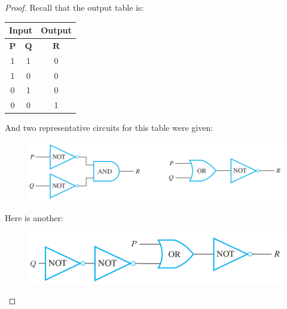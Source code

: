 \documentclass[14pt]{extarticle}
\newcommand{\cy}{\color{cyan}}
\begin{document}
\begin{proof}
        Recall that the output table is:

        \begin{center}
                \begin{tabular}{|cc|c|}
                        \hline
                        \multicolumn{2}{|c|}{\cy Input} & {\cy Output}              \\
                        \hline
                        \(\bm{P}\)                      & \(\bm{Q}\)   & \(\bm{R}\) \\
                        \hline
                        1                               & 1            & 0          \\
                        \hline
                        1                               & 0            & 0          \\
                        \hline
                        0                               & 1            & 0          \\
                        \hline
                        0                               & 0            & 1          \\
                        \hline
                \end{tabular}
        \end{center}

        And two representative circuits for this table were given:

        \begin{figure}[ht!]
                \centering
                \includegraphics[scale=0.5]{../images/8.3.35.png}
        \end{figure}

        Here is another:

        \begin{figure}[ht!]
                \centering
                \includegraphics[scale=0.5]{../images/8.3.35.2.png}
        \end{figure}
\end{proof}
\end{document}
